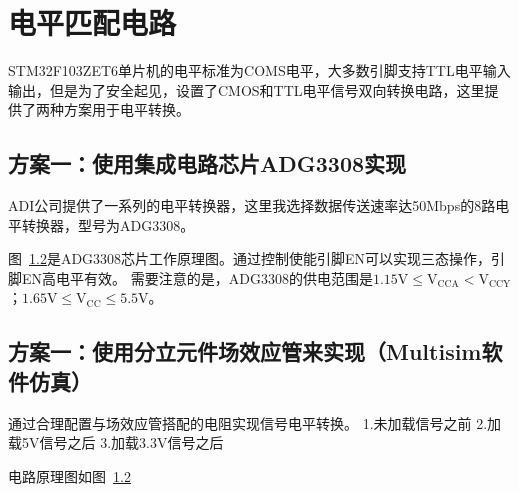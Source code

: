 \section{ 电平匹配电路}
STM32F103ZET6单片机的电平标准为COMS电平，大多数引脚支持TTL电平输入输出，但是为了安全起见，设置了CMOS和TTL电平信号双向转换电路，这里提供了两种方案用于电平转换。

\subsection{ 方案一：使用集成电路芯片ADG3308实现}
ADI公司提供了一系列的电平转换器，这里我选择数据传送速率达50Mbps的8路电平转换器，型号为ADG3308。

图~\ref{}是ADG3308芯片工作原理图。通过控制使能引脚EN可以实现三态操作，引脚EN高电平有效。
需要注意的是，ADG3308的供电范围是$ 1.15 \mathrm { V } \leq \mathrm { V } _ { \mathrm { CCA } } < \mathrm { V } _ { \mathrm { CCY} } $；$ 1.65 \mathrm { V } \leq \mathrm { V } _ { \mathrm { CC } } \leq 5.5 \mathrm { V } $。
\subsection{ 方案一：使用分立元件场效应管来实现（Multisim软件仿真）}
通过合理配置与场效应管搭配的电阻实现信号电平转换。
1.未加载信号之前
2.加载5V信号之后
3.加载3.3V信号之后

电路原理图如图~\ref{}


